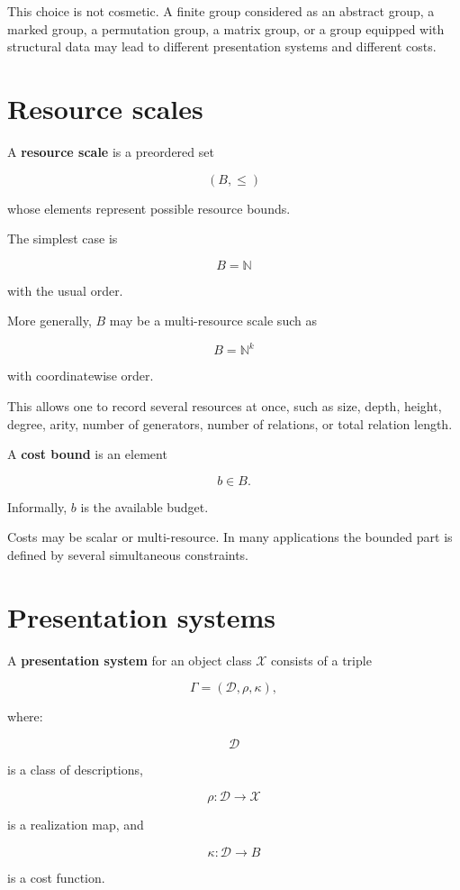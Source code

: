 \documentclass[11pt]{article}
\begin{document}
This choice is not cosmetic. A finite group considered as an abstract group, a marked group, a permutation group, a matrix group, or a group equipped with structural data may lead to different presentation systems and different costs.


\section{Resource scales}

A \textbf{resource scale} is a preordered set

\[
(B,\leq)
\]

whose elements represent possible resource bounds.

The simplest case is

\[
B=\mathbb N
\]

with the usual order.

More generally, \(B\) may be a multi-resource scale such as

\[
B=\mathbb N^k
\]

with coordinatewise order.

This allows one to record several resources at once, such as size, depth, height, degree, arity, number of generators, number of relations, or total relation length.

A \textbf{cost bound} is an element

\[
b\in B.
\]

Informally, \(b\) is the available budget.

Costs may be scalar or multi-resource. In many applications the bounded part is defined by several simultaneous constraints.


\section{Presentation systems}

A \textbf{presentation system} for an object class \(\mathcal X\) consists of a triple

\[
\Gamma=(\mathcal D,\rho,\kappa),
\]

where:

\[
\mathcal D
\]

is a class of descriptions,

\[
\rho:\mathcal D\to \mathcal X
\]

is a realization map, and

\[
\kappa:\mathcal D\to B
\]

is a cost function.
\end{document}
